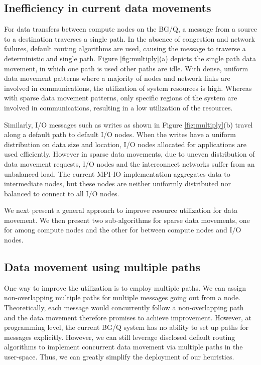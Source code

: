 \documentclass[final,5p,times]{elsarticle}
\begin{document}
\subsection{Inefficiency in current data movements}
For data transfers between compute nodes on the BG/Q, a message from a source to a destination traverses a single path. In the absence of congestion and network failures, default routing algorithms are used, causing the message to traverse a deterministic and single path. Figure \ref{fig:multiply}(a) depicts the single path data movement, in which one path is used other paths are idle. With dense, uniform data movement patterns where a majority of nodes and network links are involved in communications, the utilization of system resources is high. Whereas with sparse data movement patterns, only specific regions of the system are involved in communications, resulting in a low utilization of the resources.

Similarly, I/O messages such as writes as shown in Figure \ref{fig:multiply}(b) travel along a default path to default I/O nodes. When the writes  have a uniform distribution on data size and location, I/O nodes allocated for applications are used efficiently. However in sparse data movements, due to uneven distribution of data movement requests, I/O nodes and the interconnect networks suffer from an unbalanced load. The current MPI-IO implementation aggregates data to intermediate nodes, but these nodes are neither uniformly distributed nor balanced to connect to all I/O nodes. 

We next present a general approach to improve resource utilization for data movement. We then present two sub-algorithms for sparse data movements, one for among compute nodes and the other for between compute nodes and I/O nodes.

\subsection{Data movement using multiple paths}
One way to improve the utilization is to employ multiple paths. We can assign non-overlapping multiple paths for multiple messages going out from a node. Theoretically, each message would concurrently follow a non-overlapping path and the data movement therefore promises to achieve  improvement. However, at programming level, the current BG/Q system has no ability to set up paths for messages explicitly. However, we can still leverage disclosed default routing algorithms to implement concurrent data movement via multiple paths in the user-space. Thus, we can greatly simplify the deployment of our heuristics.
\end{document}
